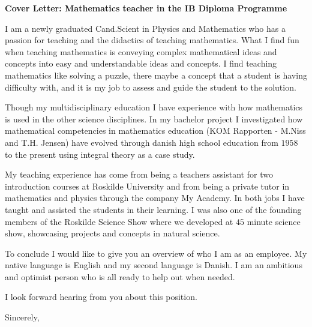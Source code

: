 \documentclass[12pt,a4paper]{letter}
\begin{document}
\begin{letter}{}
\opening{\textbf{Cover Letter: Mathematics teacher in the IB Diploma Programme}} 

I am a newly graduated Cand.Scient in Physics and Mathematics who has a passion for teaching and the didactics of teaching mathematics. What I find fun when teaching mathematics is conveying complex mathematical ideas and concepts into easy and understandable ideas and concepts. I find teaching mathematics like solving a puzzle, there maybe a concept that a student is having difficulty with, and it is my job to assess and guide the student to the solution.

Though my multidisciplinary education I have experience with how mathematics is used in the other science disciplines. In my bachelor project I investigated how mathematical competencies in mathematics education (KOM Rapporten - M.Niss and T.H. Jensen) have evolved through danish high school education from $1958$ to the present using integral theory as a case study.

My teaching experience has come from being a teachers assistant for two introduction courses at Roskilde University and from being a private tutor in mathematics and physics through the company My Academy. In both jobs I have taught and assisted the students in their learning. I was also one of the founding members of the Roskilde Science Show where we developed at $45$ minute science show, showcasing projects and concepts in natural science.

To conclude I would like to give you an overview of who I am as an employee. My native language is English and my second language is Danish. I am an ambitious and optimist person who is all ready to help out when needed.

I look forward hearing from you about this position.

\closing{Sincerely,}
\end{letter}
\end{document}
